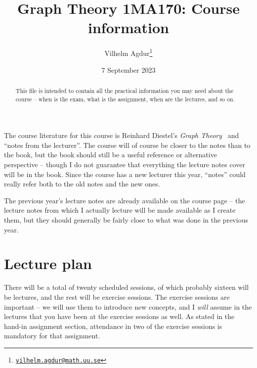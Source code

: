 \documentclass{tufte-handout}
\title{Graph Theory 1MA170: Course information}
\author[Vilhelm Agdur]{Vilhelm Agdur\thanks{\href{mailto:vilhelm.agdur@math.uu.se}{\nolinkurl{vilhelm.agdur@math.uu.se}}}}
\date{7 September 2023}
\begin{document}
\maketitle%

\begin{abstract}
\noindent
This file is intended to contain all the practical information you may need about the course -- when is the exam, what is the assignment, when are the lectures, and so on.
\end{abstract}

The course literature for this course is Reinhard Diestel's \emph{Graph Theory}~\cite{Diestel_course_book} and ``notes from the lecturer''. The course will of course be closer to the notes than to the book, but the book should still be a useful reference or alternative perspective -- though I do not guarantee that everything the lecture notes cover will be in the book. Since the course has a new lecturer this year, ``notes'' could really refer both to the old notes and the new ones.

The previous year's lecture notes are already available on the course page -- the lecture notes from which I actually lecture will be made available as I create them, but they should generally be fairly close to what was done in the previous year.

\section{Lecture plan}

There will be a total of twenty scheduled sessions, of which probably sixteen will be lectures, and the rest will be exercise sessions. The exercise sessions are important -- we will use them to introduce new concepts, and I \emph{will} assume in the lectures that you have been at the exercise sessions as well. As stated in the hand-in assignment section, attendance in two of the exercise sessions is mandatory for that assignment.
\end{document}
